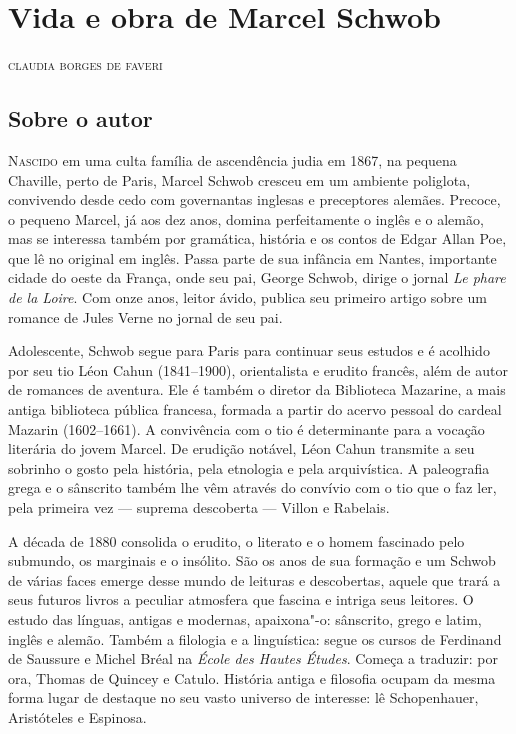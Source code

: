 \chapter{Vida e obra de Marcel Schwob}

\begin{flushright}
\textsc{claudia borges de faveri}
\end{flushright}\bigskip

\section{Sobre o autor}

\noindent\textsc{Nascido} em uma culta família de ascendência judia em 1867, na pequena
Chaville, perto de Paris, Marcel Schwob cresceu em um ambiente poliglota,
convivendo desde cedo com governantas inglesas e preceptores alemães. Precoce,
o pequeno Marcel, já aos dez anos, domina perfeitamente o inglês e o alemão,
mas se interessa também por gramática, história e os contos de Edgar Allan Poe,
que lê no original em inglês. Passa parte de sua infância em Nantes,
importante cidade do oeste da França, onde seu pai, George Schwob, dirige o
jornal \textit{Le phare de la Loire}. Com onze anos, leitor ávido, publica seu
primeiro artigo sobre um romance de Jules Verne no jornal de seu pai.

Adolescente, Schwob segue para Paris para continuar seus estudos e é
acolhido por seu tio Léon Cahun (1841--1900), orientalista e erudito francês,
além de autor de romances de aventura. Ele é também o diretor da Biblioteca
Mazarine, a mais antiga biblioteca pública francesa, formada a partir do acervo
pessoal do cardeal Mazarin (1602--1661). A convivência com o tio é determinante
para a vocação literária do jovem Marcel. De erudição notável, Léon Cahun
transmite a seu sobrinho o gosto pela história, pela etnologia e pela
arquivística. A paleografia grega e o sânscrito também lhe vêm através do
convívio com o tio que o faz ler, pela primeira vez --- suprema descoberta --- Villon e Rabelais.

A década de 1880 consolida o erudito, o literato e o homem fascinado pelo
submundo, os marginais e o insólito. São os anos de sua formação e um Schwob de
várias faces emerge desse mundo de leituras e descobertas, aquele que trará a
seus futuros livros a peculiar atmosfera que fascina e intriga seus leitores. O
estudo das línguas, antigas e modernas, apaixona"-o: sânscrito, grego e latim,
inglês e alemão. Também a filologia e a linguística: segue os cursos de
Ferdinand de Saussure e Michel Bréal na \textit{École des Hautes Études}.
Começa a traduzir: por ora, Thomas de Quincey e Catulo. História antiga e
filosofia ocupam da mesma forma lugar de destaque no seu vasto universo de
interesse: lê Schopenhauer, Aristóteles e Espinosa.

